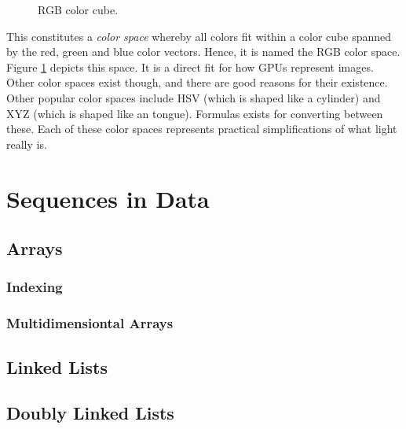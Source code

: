 \begin{figure}[tbp]
  
  \caption{RGB color cube.}
  \label{fig:primdata:struct:color}
\end{figure}

This constitutes a \textsl{color space} whereby all colors fit within a color cube spanned by the red, green and blue color vectors. Hence, it is named the RGB color space. Figure \ref{fig:primdata:struct:color} depicts this space. It is a direct fit for how GPUs represent images. Other color spaces exist though, and there are good reasons for their existence. Other popular color spaces include HSV (which is shaped like a cylinder) and XYZ (which is shaped like an tongue). Formulas exists for converting between these. Each of these color spaces represents practical simplifications of what light really is.

\csharpsubsection{\csharp}


\section{Sequences in Data}

\subsection{Arrays}

\subsubsection{Indexing}


\subsubsection{Multidimensiontal Arrays}

\subsection{Linked Lists}


\subsection{Doubly Linked Lists}

